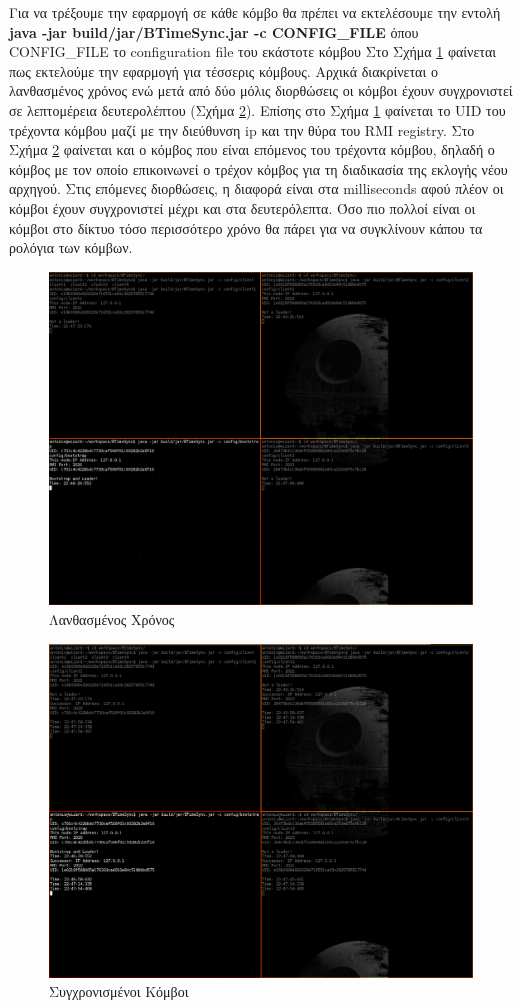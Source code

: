 \documentclass{article}
\begin{document}
Για να τρέξουμε την εφαρμογή σε κάθε κόμβο θα πρέπει να εκτελέσουμε την
εντολή \textbf{java -jar build/jar/BTimeSync.jar -c CONFIG\_FILE} όπου
CONFIG\_FILE το configuration file του εκάστοτε κόμβου Στο Σχήμα
\ref{sync_start} φαίνεται πως εκτελούμε την εφαρμογή για τέσσερις κόμβους.
Αρχικά διακρίνεται ο λανθασμένος χρόνος ενώ μετά από δύο μόλις διορθώσεις οι
κόμβοι έχουν συγχρονιστεί σε λεπτομέρεια δευτερολέπτου (Σχήμα \ref{sync_after}).
Επίσης στο Σχήμα \ref{sync_start} φαίνεται το UID του τρέχοντα κόμβου μαζί με
την διεύθυνση ip και την θύρα του RMI registry. Στο Σχήμα \ref{sync_after}
φαίνεται και ο κόμβος που είναι επόμενος του τρέχοντα κόμβου, δηλαδή ο κόμβος με
τον οποίο επικοινωνεί ο τρέχον κόμβος για τη διαδικασία της εκλογής νέου
αρχηγού.
Στις επόμενες διορθώσεις, η διαφορά είναι στα milliseconds αφού πλέον οι κόμβοι
έχουν συγχρονιστεί μέχρι και στα δευτερόλεπτα. Όσο πιο πολλοί είναι οι κόμβοι
στο δίκτυο τόσο περισσότερο χρόνο θα πάρει για να συγκλίνουν κάπου τα ρολόγια
των κόμβων.
\begin{figure}[tbh]
\centering
\includegraphics[scale=0.35]{photos/sync_start.png}
\caption{Λανθασμένος Χρόνος}
\label{sync_start}
\end{figure}

\begin{figure}[tbh]
\centering
\includegraphics[scale=0.35]{photos/sync_end.png}
\caption{Συγχρονισμένοι Κόμβοι}
\label{sync_after}
\end{figure}
\nocite{*}


\end{document}
